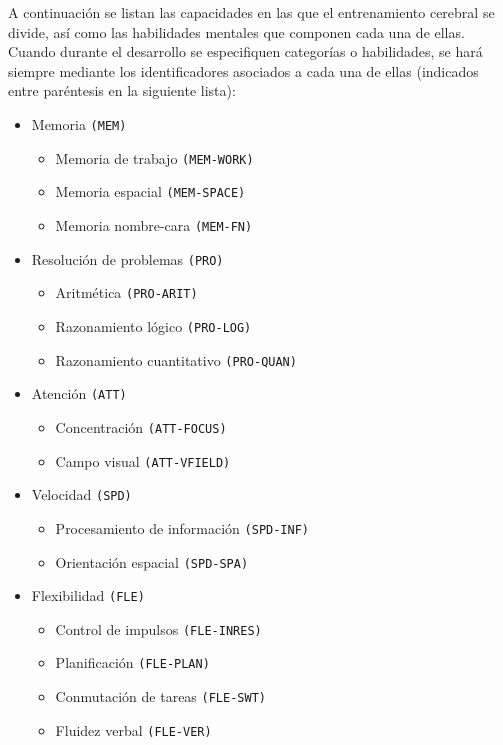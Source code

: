 A continuación se listan las capacidades en las que el entrenamiento cerebral se divide, así como las habilidades mentales que componen cada una de ellas. Cuando durante el desarrollo se especifiquen categorías o habilidades, se hará siempre mediante los identificadores asociados a cada una de ellas (indicados entre paréntesis en la siguiente lista):

\begin{itemize}
\item Memoria {\tt (MEM)}
  \begin{itemize}
  \item Memoria de trabajo {\tt (MEM-WORK)}
  \item Memoria espacial {\tt (MEM-SPACE)}
  \item Memoria nombre-cara {\tt (MEM-FN)}
  \end{itemize}

\item Resolución de problemas {\tt (PRO)}
  \begin{itemize}
  \item Aritmética {\tt (PRO-ARIT)}
  \item Razonamiento lógico {\tt (PRO-LOG)}
  \item Razonamiento cuantitativo {\tt (PRO-QUAN)}
  \end{itemize}

\item Atención {\tt (ATT)}
  \begin{itemize}
  \item Concentración {\tt (ATT-FOCUS)}
  \item Campo visual {\tt (ATT-VFIELD)}
  \end{itemize}

\item Velocidad {\tt (SPD)}
  \begin{itemize}
  \item Procesamiento de información {\tt (SPD-INF)}
  \item Orientación espacial {\tt (SPD-SPA)}
  \end{itemize}

\item Flexibilidad {\tt (FLE)}
  \begin{itemize}
  \item Control de impulsos {\tt (FLE-INRES)}
  \item Planificación {\tt (FLE-PLAN)}
  \item Conmutación de tareas {\tt (FLE-SWT)}
  \item Fluidez verbal {\tt (FLE-VER)}
  \end{itemize}
\end{itemize}


